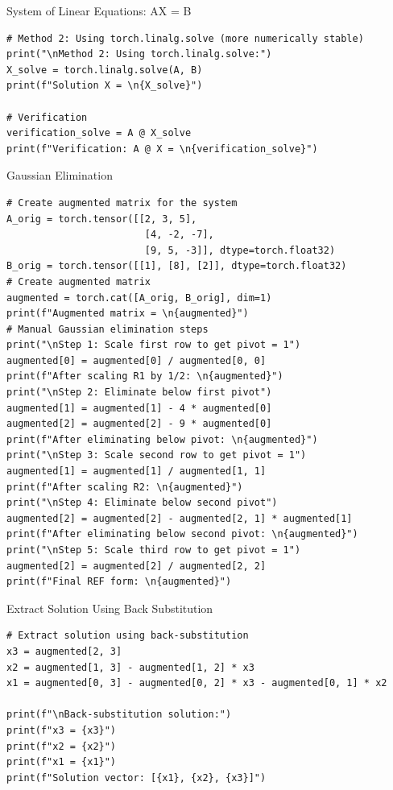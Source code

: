 \documentclass[aspectratio=169,xcolor=dvipsnames,svgnames,x11names,fleqn]{beamer}
\begin{document}
\begin{frame}[containsverbatim]{System of Linear Equations: AX = B}
\begin{verbatim}
# Method 2: Using torch.linalg.solve (more numerically stable)
print("\nMethod 2: Using torch.linalg.solve:")
X_solve = torch.linalg.solve(A, B)
print(f"Solution X = \n{X_solve}")

# Verification
verification_solve = A @ X_solve
print(f"Verification: A @ X = \n{verification_solve}")

\end{verbatim}
\end{frame}

\begin{frame}[containsverbatim]{Gaussian Elimination}
\begin{verbatim}
# Create augmented matrix for the system
A_orig = torch.tensor([[2, 3, 5], 
                        [4, -2, -7], 
                        [9, 5, -3]], dtype=torch.float32)
B_orig = torch.tensor([[1], [8], [2]], dtype=torch.float32)
# Create augmented matrix
augmented = torch.cat([A_orig, B_orig], dim=1)
print(f"Augmented matrix = \n{augmented}")
# Manual Gaussian elimination steps
print("\nStep 1: Scale first row to get pivot = 1")
augmented[0] = augmented[0] / augmented[0, 0]
print(f"After scaling R1 by 1/2: \n{augmented}")
print("\nStep 2: Eliminate below first pivot")
augmented[1] = augmented[1] - 4 * augmented[0]
augmented[2] = augmented[2] - 9 * augmented[0]
print(f"After eliminating below pivot: \n{augmented}")
print("\nStep 3: Scale second row to get pivot = 1")
augmented[1] = augmented[1] / augmented[1, 1]
print(f"After scaling R2: \n{augmented}")
print("\nStep 4: Eliminate below second pivot")
augmented[2] = augmented[2] - augmented[2, 1] * augmented[1]
print(f"After eliminating below second pivot: \n{augmented}")
print("\nStep 5: Scale third row to get pivot = 1")
augmented[2] = augmented[2] / augmented[2, 2]
print(f"Final REF form: \n{augmented}")
\end{verbatim}
\end{frame}



\begin{frame}[containsverbatim]{Extract Solution Using Back Substitution}
\begin{verbatim}
# Extract solution using back-substitution
x3 = augmented[2, 3]
x2 = augmented[1, 3] - augmented[1, 2] * x3
x1 = augmented[0, 3] - augmented[0, 2] * x3 - augmented[0, 1] * x2

print(f"\nBack-substitution solution:")
print(f"x3 = {x3}")
print(f"x2 = {x2}")
print(f"x1 = {x1}")
print(f"Solution vector: [{x1}, {x2}, {x3}]")
\end{verbatim}
\end{frame}
\end{document}
